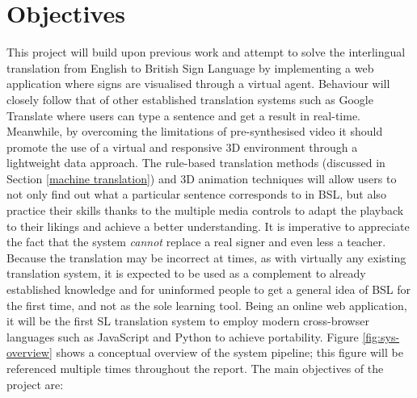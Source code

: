 \documentclass[12pt]{ociamthesis}  %
\begin{document}
\section{Objectives}
\label{objectives}
This project will build upon previous work and attempt to solve the interlingual translation from English to British Sign Language by implementing a web application where signs are visualised through a virtual agent. Behaviour will closely follow that of other established translation systems such as Google Translate where users can type a sentence and get a result in real-time. Meanwhile, by overcoming the limitations of pre-synthesised video it should promote the use of a virtual and responsive 3D environment through a lightweight data approach. The rule-based translation methods (discussed in Section \ref{machine translation}) and 3D animation techniques will allow users to not only find out what a particular sentence corresponds to in BSL, but also practice their skills thanks to the multiple media controls to adapt the playback to their likings and achieve a better understanding. It is imperative to appreciate the fact that the system \textit{cannot} replace a real signer and even less a teacher. Because the translation may be incorrect at times, as with virtually any existing translation system, it is expected to be used as a complement to already established knowledge and for uninformed people to get a general idea of BSL for the first time, and not as the sole learning tool. Being an online web application, it will be the first SL translation system to employ modern cross-browser languages such as JavaScript and Python to achieve portability. Figure \ref{fig:sys-overview} shows a conceptual overview of the system pipeline; this figure will be referenced multiple times throughout the report. The main objectives of the project are:
\end{document}
